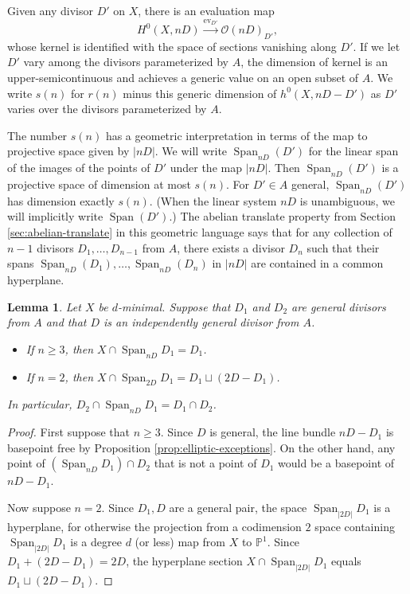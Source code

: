 \documentclass[11pt]{amsart}
\newcommand{\PP}{\mathbb{P}}
\renewcommand{\O}{\mathcal{O}}
\newcommand{\Span}{\operatorname{Span}}
\newcommand{\ev}{\operatorname{ev}}
\newtheorem{lemma}[theorem]{Lemma}
\theoremstyle{definition}
\theoremstyle{remark}
\begin{document}
Given any divisor $D'$ on $X$, there is an evaluation map
\[ H^0(X, nD) \xrightarrow{\ev_{D'}} \O(nD)_{D'}, \]
whose kernel is identified with the space of sections vanishing along $D'$.  If we let $D'$ vary among the divisors parameterized by $A$, the dimension of kernel is an upper-semicontinuous and achieves a generic value on an open subset of $A$.  We write $s(n)$ for $r(n)$ minus this generic dimension of $h^0(X, nD - D')$ as $D'$ varies over the divisors parameterized by $A$.

The number $s(n)$ has a geometric interpretation in terms of the map to projective space given by $|nD|$.  We will write $\Span_{nD}(D')$ for the linear span of the images of the points of $D'$ under the map $|nD|$.  Then $\Span_{nD}(D')$ is a projective space of dimension at most $s(n)$.  For $D' \in A$ general, $\Span_{nD}(D')$ has dimension exactly $s(n)$.  (When the linear system $nD$ is unambiguous, we will implicitly write $\Span(D')$.) The abelian translate property from Section \ref{sec:abelian-translate} in this geometric language says that for any collection of $n-1$ divisors $D_1, \dots, D_{n-1}$ from $A$, there exists a divisor $D_n$ such that their spans $\Span_{nD}(D_1), \dots, \Span_{nD}(D_{n})$ in $|nD|$ are contained in a common hyperplane.


\begin{lemma}\label{lem:spans_meets_divisor}  Let \(X\) be \(d\)-minimal.
Suppose that \(D_1\) and \(D_2\) are general divisors from \(A\) and that \(D\) is an independently general divisor from \(A\).  
\begin{itemize}
\item If \(n \geqslant 3\), then \(X \cap \Span_{nD}D_1 = D_1\).
\item If \(n = 2\), then \(X \cap \Span_{2D} D_1  = D_1 \sqcup (2D - D_1)\).
\end{itemize}
In particular, \(D_2 \cap \Span_{nD} D_1 = D_1 \cap D_2\).
\end{lemma}
\begin{proof}
First suppose that $n \geqslant 3$. Since \(D\) is general, the line bundle \(nD - D_1\) is basepoint free by Proposition \ref{prop:elliptic-exceptions}.  On the other hand, any point of  \((\Span_{nD} D_1)\cap D_2\) that is not a point of \(D_1\) would be a basepoint of \(nD - D_1\).

Now suppose $n=2$. Since $D_1, D$ are a general pair, the space $\Span_{|2D|} D_1$ is a hyperplane, for otherwise the projection from  a codimension $2$ space containing $\Span_{|2D|} D_1$ is a degree $d$ (or less) map from $X$ to $\PP^1$. Since $D_1+(2D-D_1)=2D$, the hyperplane section $X \cap \Span_{|2D|} D_1 $ equals $D_1 \sqcup (2D-D_1).$ 
\end{proof}
\end{document}
